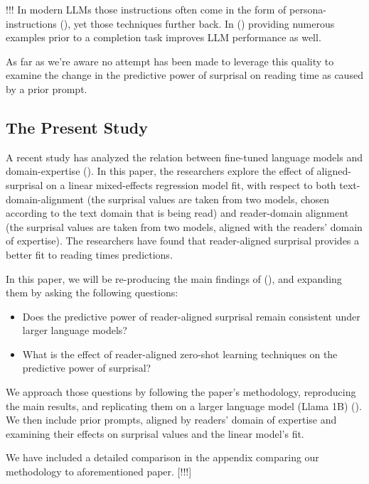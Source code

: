 \documentclass[10pt,letterpaper]{article}
\begin{document}
!!! In modern LLMs those instructions often come in the form of persona-instructions (), yet those techniques further back. In () providing numerous examples prior to a completion task improves LLM performance as well.

As far as we're aware no attempt has been made to leverage this quality to examine the change in the predictive power of surprisal on reading time as caused by a prior prompt.

\subsection{The Present Study}

A recent study has analyzed the relation between fine-tuned language models and domain-expertise ().
In this paper, the researchers explore the effect of aligned-surprisal on a linear mixed-effects regression model fit, with respect to both text-domain-alignment (the surprisal values are taken from two models, chosen according to the text domain that is being read) and reader-domain alignment (the surprisal values are taken from two models, aligned with the readers' domain of expertise).
The researchers have found that reader-aligned surprisal provides a better fit to reading times predictions.

In this paper, we will be re-producing the main findings of (), and expanding them by asking the following questions:

\begin{itemize}
  \item Does the predictive power of reader-aligned surprisal remain consistent under larger language models?
  \item What is the effect of reader-aligned zero-shot learning techniques on the predictive power of surprisal?
\end{itemize}

We approach those questions by following the paper's methodology, reproducing the main results, and replicating them on a larger language model (Llama 1B) ().
We then include prior prompts, aligned by readers' domain of expertise and examining their effects on surprisal values and the linear model's fit.

We have included a detailed comparison in the appendix comparing our methodology to aforementioned paper. [!!!]

\end{document}
